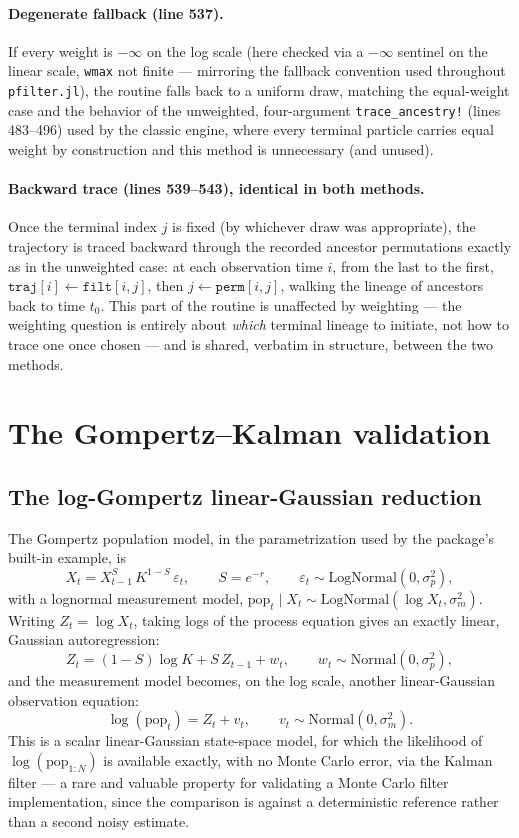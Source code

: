 \documentclass[11pt]{article}
\begin{document}
\paragraph{Degenerate fallback (line 537).} If every weight is
$-\infty$ on the log scale (here checked via a $-\infty$ sentinel on the
linear scale, \texttt{wmax} not finite — mirroring the fallback convention
used throughout \texttt{pfilter.jl}), the routine falls back to a uniform
draw, matching the equal-weight case and the behavior of the unweighted,
four-argument \texttt{trace\_ancestry!} (lines 483--496) used by the classic
engine, where every terminal particle carries equal weight by construction
and this method is unnecessary (and unused).

\paragraph{Backward trace (lines 539--543), identical in both methods.} Once
the terminal index $j$ is fixed (by whichever draw was appropriate), the
trajectory is traced backward through the recorded ancestor permutations
exactly as in the unweighted case: at each observation time $i$, from the
last to the first, $\texttt{traj}[i]\leftarrow \texttt{filt}[i,j]$, then
$j\leftarrow \texttt{perm}[i,j]$, walking the lineage of ancestors back to
time $t_0$. This part of the routine is unaffected by weighting — the
weighting question is entirely about \emph{which} terminal lineage to
initiate, not how to trace one once chosen — and is shared, verbatim in
structure, between the two methods.

\section{The Gompertz--Kalman validation}
\label{sec:kalman}

\subsection{The log-Gompertz linear-Gaussian reduction}

The Gompertz population model, in the parametrization used by the package's
built-in example, is
\[
X_t = X_{t-1}^{S}\, K^{1-S}\, \varepsilon_t, \qquad S = e^{-r}, \qquad
\varepsilon_t \sim \mathrm{LogNormal}(0,\sigma_p^2),
\]
with a lognormal measurement model, $\mathrm{pop}_t \mid X_t \sim
\mathrm{LogNormal}(\log X_t, \sigma_m^2)$. Writing $Z_t = \log X_t$, taking
logs of the process equation gives an exactly linear, Gaussian
autoregression:
\[
Z_t = (1-S)\log K + S\,Z_{t-1} + w_t, \qquad w_t \sim \mathrm{Normal}(0,\sigma_p^2),
\]
and the measurement model becomes, on the log scale, another linear-Gaussian
observation equation:
\[
\log(\mathrm{pop}_t) = Z_t + v_t, \qquad v_t \sim \mathrm{Normal}(0,\sigma_m^2).
\]
This is a scalar linear-Gaussian state-space model, for which the likelihood
of $\log(\mathrm{pop}_{1:N})$ is available exactly, with no Monte Carlo
error, via the Kalman filter — a rare and valuable property for validating a
Monte Carlo filter implementation, since the comparison is against a
deterministic reference rather than a second noisy estimate.
\end{document}
